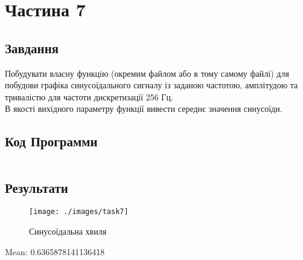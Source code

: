 \section{Частина 7}
\label{sec:task7}

\subsection{Завдання}
\label{subsec:task7_task}

Побудувати власну функцію (окремим файлом або в тому самому файлі)
для побудови графіка синусоїдального сигналу із заданою частотою,
амплітудою та тривалістю для частоти дискретизації 256 Гц. \\
В якості вихідного параметру функції вивести середнє значення синусоїди.

\subsection{Код Программи}
\label{subsec:task7_code}
\inputminted{python}{../src/task7.py}

\subsection{Результати}
\label{subsec:task7_results}

\begin{figure}[!ht]
    \centering
    \texttt{[image: ./images/task7]}
    \caption{Синусоїдальна хвиля}
    \label{fig:sine_wave}
\end{figure}

Mean: 0.6365878141136418
